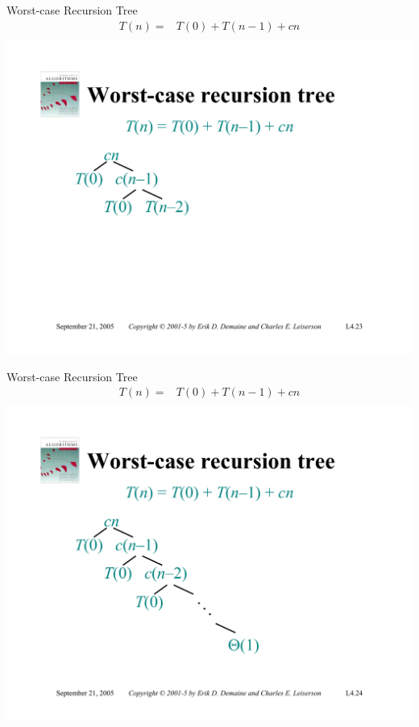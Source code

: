 \documentclass{beamer}
\begin{document}
\begin{frame}{Worst-case Recursion Tree}
    \begin{equation*}
        \begin{split}
            T(n) =& T(0) + T(n - 1) + cn \\
        \end{split}
    \end{equation*}
    \centering
    \includegraphics[width=\textwidth, trim={1.00cm 1.80cm 0.50cm 5.25cm}, clip]{pages/lec4_23}
\end{frame}
\begin{frame}{Worst-case Recursion Tree}
    \begin{equation*}
        \begin{split}
            T(n) =& T(0) + T(n - 1) + cn \\
        \end{split}
    \end{equation*}
    \centering
    \includegraphics[width=\textwidth, trim={1.00cm 1.80cm 0.50cm 5.25cm}, clip]{pages/lec4_24}
\end{frame}
\end{document}
